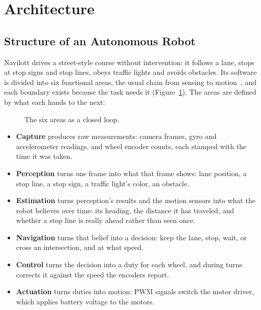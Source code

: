 \section{Architecture}
\label{sec:architecture}

\subsection{Structure of an Autonomous Robot}
Navilott drives a street-style course without intervention: it follows a lane,
stops at stop signs and stop lines, obeys traffic lights and avoids obstacles.
Its software is divided into six functional areas, the usual chain from sensing
to motion~\citep{douglas2020autonav1}, and each boundary exists because the
task needs it (Figure~\ref{fig:robot-loop}). The areas are defined by what each
hands to the next:

\begin{figure}[H]
      \centering
      
      \caption{The six areas as a closed loop.}
      \label{fig:robot-loop}
\end{figure}

\begin{itemize}
      \item \textbf{Capture} produces raw measurements: camera frames, gyro and
            accelerometer readings, and wheel encoder counts, each stamped with
            the time it was taken.
      \item \textbf{Perception} turns one frame into what that frame shows: lane
            position, a stop line, a stop sign, a traffic light's color, an
            obstacle.
      \item \textbf{Estimation} turns perception's results and the motion
            sensors into what the robot believes over time: its heading, the
            distance it has traveled, and whether a stop line is really ahead
            rather than seen once.
      \item \textbf{Navigation} turns that belief into a decision: keep the
            lane, stop, wait, or cross an intersection, and at what speed.
      \item \textbf{Control} turns the decision into a duty for each wheel,
            and during turns corrects it against the speed the encoders
            report.
      \item \textbf{Actuation} turns duties into motion: PWM signals switch the
            motor driver, which applies battery voltage to the motors.
\end{itemize}

